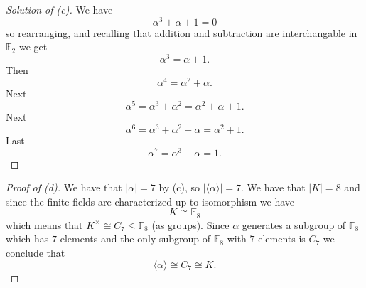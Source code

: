 \begin{proof}[Solution of (c)]
    We have 
    \[
        \alpha^3 + \alpha + 1 = 0
    \]
    so rearranging, and recalling that 
    addition and subtraction are interchangable 
    in $\mathbb F_2$ we get 
    \[
        \alpha^3 = \alpha + 1. 
    \]
    Then 
    \[
        \alpha^4 = \alpha^2 + \alpha. 
    \]
    Next 
    \[
        \alpha^5 = \alpha^3 + \alpha^2 = \alpha^2 + \alpha + 1. 
    \]
    Next 
    \[
        \alpha^6 = \alpha^3 + \alpha^2 + \alpha 
        = \alpha^2 + 1. 
    \]
    Last 
    \[
        \alpha^7 = \alpha^3 + \alpha 
        = 1. 
    \]
\end{proof}

\begin{proof}[Proof of (d)]
    We have that $|\alpha| = 7$ by (c), so 
    $|\langle \alpha \rangle| = 7$.
    We have that $|K| = 8$ and since 
    the finite fields are characterized up 
    to isomorphism we have 
    \[
        K \cong \mathbb F_8
    \]
    which means that $K^\times \cong C_7 
    \leq \mathbb F_8$ (as groups).
    Since $\alpha$ generates 
    a subgroup of $\mathbb F_8$ which has 
    $7$ elements and the only subgroup of 
    $\mathbb F_8$ with $7$ elements is 
    $C_7$ we conclude that 
    \[
        \langle \alpha \rangle 
        \cong C_7 
        \cong K.
    \]
\end{proof}
